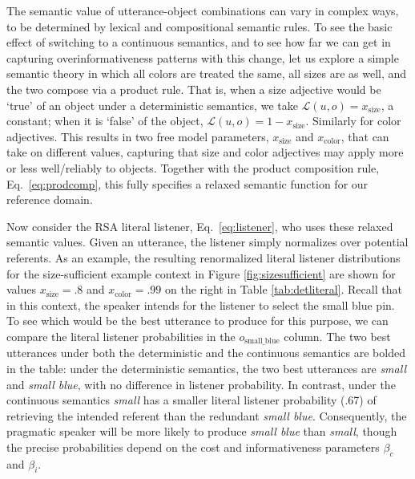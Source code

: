 \documentclass[11pt]{article}
\newcommand{\tableref}[1]{Table \ref{#1}}
\newcommand{\figref}[1]{Figure \ref{#1}}
\begin{document}
The semantic value of utterance-object combinations can vary in complex ways, to be determined by lexical and compositional semantic rules.
To see the basic effect of switching to a continuous semantics, and to see how far we can get in capturing overinformativeness patterns with this change, let us explore a simple semantic theory in which all colors are treated the same, all sizes are as well, and the two compose via a product rule.
That is, when a size adjective would be `true' of an object under a deterministic semantics, we take $\mathcal{L}(u,o) = x_{\text{size}}$, a constant; when it is `false' of the object, $\mathcal{L}(u,o) = 1 - x_{\text{size}}$. 
Similarly for color adjectives. 
This results in two free model parameters, $x_{\text{size}}$ and $x_{\text{color}}$, that can take on different values, capturing that size and color adjectives may apply more or less well/reliably to objects.
Together with the product composition rule, Eq.~\ref{eq:prodcomp}, this fully specifies a relaxed semantic function for our reference domain.

Now consider the RSA literal listener, Eq.~\ref{eq:listener}, who uses these relaxed semantic values.
Given an utterance, the listener simply normalizes over potential referents. 
As an example, the resulting renormalized literal listener distributions for the size-sufficient example context in \figref{fig:sizesufficient} are shown for values $x_{\text{size}} = .8$ and $x_{\text{color}} = .99$  on the right in \tableref{tab:detliteral}. Recall that in this context, the speaker intends for the listener to select the small blue pin. To see which would be the best utterance to produce for this purpose, we can compare the literal listener probabilities in the $o_{\text{small\_blue}}$ column. The two best utterances under both the deterministic and the continuous semantics are bolded in the table: under the deterministic semantics, the two best utterances are \emph{small} and \emph{small blue}, with no difference in listener probability. In contrast, under the continuous semantics \emph{small} has a smaller literal listener probability (.67) of retrieving the intended referent than the redundant \emph{small blue}. Consequently, the pragmatic speaker will be more likely to produce \emph{small blue} than \emph{small}, though the precise probabilities depend on the cost and informativeness parameters $\beta_c$ and $\beta_i$. 
\end{document}
